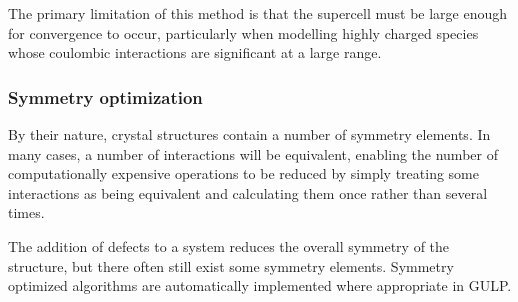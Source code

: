 The primary limitation of this method is that the supercell must be large enough for convergence to occur, particularly when modelling highly charged species whose coulombic interactions are significant at a large range.

\subsubsection{Symmetry optimization}
By their nature, crystal structures contain a number of symmetry elements.
In many cases, a number of interactions will be equivalent, enabling the number of computationally expensive operations to be reduced by simply treating some interactions as being equivalent and calculating them once rather than several times.

The addition of defects to a system reduces the overall symmetry of the structure, but there often still exist some symmetry elements.
Symmetry optimized algorithms are automatically implemented where appropriate in GULP.

\newpage
